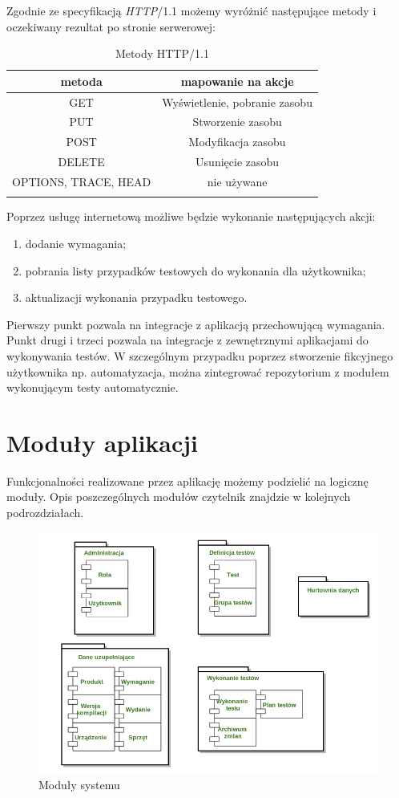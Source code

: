 Zgodnie ze specyfikacją \textit{HTTP}/1.1 możemy wyróżnić następujące metody i oczekiwany rezultat po stronie serwerowej:

\renewcommand\multirowsetup{\centering\arraybackslash}
\begin{longtable}{|c|c|}
\hline
\textbf{metoda} & \textbf{mapowanie na akcje} \\ \hline
GET & Wyświetlenie, pobranie zasobu \\ \hline
PUT & Stworzenie zasobu \\ \hline
POST & Modyfikacja zasobu \\ \hline
DELETE & Usunięcie zasobu \\ \hline
OPTIONS, TRACE, HEAD & nie używane \\ \hline

\caption{Metody HTTP/1.1 \cite{http}}
\end{longtable}

Poprzez usługę internetową możliwe będzie wykonanie następujących akcji:
\begin{enumerate}
  \item dodanie wymagania;
  \item pobrania listy przypadków testowych do wykonania dla użytkownika;
  \item aktualizacji wykonania przypadku testowego.
\end{enumerate}
Pierwszy punkt pozwala na integracje z aplikacją przechowującą wymagania. Punkt drugi i trzeci pozwala na integracje z zewnętrznymi aplikacjami do wykonywania testów. W szczególnym przypadku poprzez stworzenie fikcyjnego użytkownika np. automatyzacja, można zintegrować repozytorium z modułem wykonującym testy automatycznie.


\section{Moduły aplikacji}
Funkcjonalności realizowane przez aplikację możemy podzielić na logicznę moduły. Opis poszczególnych modułów czytelnik znajdzie w kolejnych podrozdziałach.
\begin{figure}[h]
\centerline{\includegraphics[scale=0.5]{img/komponenty.png}}
\caption{Moduły systemu}
\label{fig:moduly}
\end{figure}

